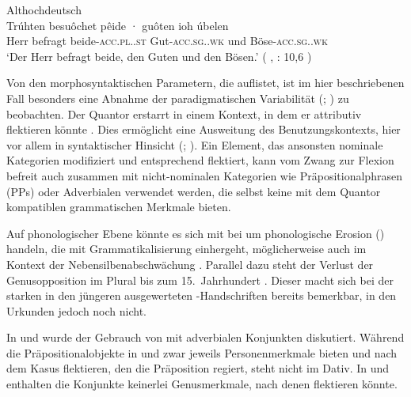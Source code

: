 \begin{exe}
\ex \label{ex:beidejohahd_2_copy}
	\langinfo%
		{Althochdeutsch}%
		{}%
		{\cite[35]{tax1979}}\\
	\gll Trúhten besuôchet pêide · guôten ioh úbelen \\
			Herr befragt beide-\textsc{acc.pl.\MascA.st} {}
				Gut-\textsc{acc.sg.\MascA.wk} und
				Böse-\textsc{acc.sg.\MascA.wk} \\
		\trans `Der Herr befragt beide, den Guten und den Bösen.'
			(%
				, : 10,6%
			)
\end{exe}

Von den morphosyntaktischen Parametern, die \citet[174]{lehmann2015} auflistet,
ist im hier beschriebenen Fall besonders eine Abnahme der paradigmatischen
Variabilität (; \cite[146--150]{lehmann2015}) zu
beobachten. Der Quantor erstarrt in einem Kontext, in dem er attributiv
flektieren könnte . Dies
ermöglicht eine Ausweitung des Benutzungskontexts, hier vor allem in
syntaktischer Hinsicht (;
\cite[150--151]{lehmann2015}). Ein Element, das ansonsten nominale Kategorien
modifiziert und entsprechend flektiert, kann vom Zwang zur Flexion befreit auch
zusammen mit nicht-nominalen Kategorien wie Präpositionalphrasen (PPs) oder
Adverbialen verwendet werden, die selbst keine mit dem Quantor
kompatiblen grammatischen Merkmale bieten.

Auf phonologischer Ebene könnte es sich mit \citet[134--136]{lehmann2015} bei
 um phonologische Erosion () handeln,
die mit Grammatikalisierung einhergeht, möglicherweise auch im Kontext der
Nebensilbenabschwächung \autocite[88--92]{braune2018}. Parallel dazu steht der
Verlust der Genusopposition im Plural bis zum 15.~Jahrhundert
\autocites[203]{paul2007}[191--192]{reichmannwegera1993}. Dieser macht sich bei
der starken  in den jüngeren ausgewerteten
\KC{}-Handschriften bereits bemerkbar, in den Urkunden jedoch noch nicht.

In  und 
wurde der Gebrauch von  mit adverbialen Konjunkten
diskutiert. Während die Präpositionalobjekte in  und
 zwar jeweils Personenmerkmale bieten und nach dem
Kasus flektieren, den die Präposition regiert, steht  nicht im
Dativ. In  und  enthalten die
Konjunkte keinerlei Genusmerkmale, nach denen  flektieren könnte.

